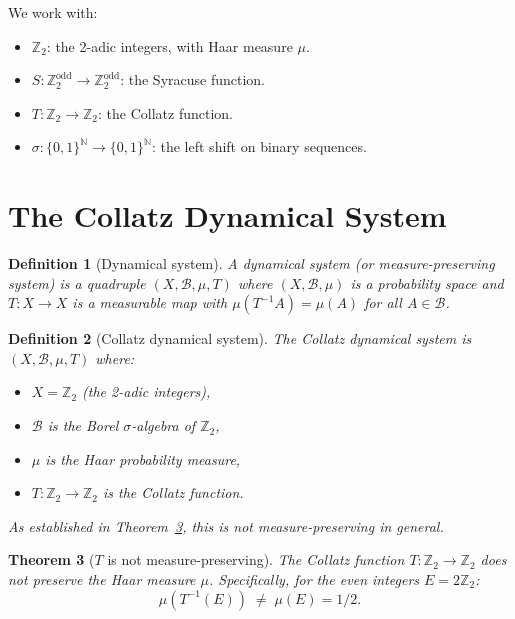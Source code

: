 \documentclass[12pt,a4paper]{article}
\newtheorem{theorem}{Theorem}[section]
\newtheorem{definition}[theorem]{Definition}
\begin{document}
We work with:
\begin{itemize}
  \item $\mathbb{Z}_2$: the 2-adic integers, with Haar measure $\mu$.
  \item $S\colon \mathbb{Z}_2^{\text{odd}} \to \mathbb{Z}_2^{\text{odd}}$: the Syracuse function.
  \item $T\colon \mathbb{Z}_2 \to \mathbb{Z}_2$: the Collatz function.
  \item $\sigma\colon \{0,1\}^\mathbb{N} \to \{0,1\}^\mathbb{N}$: the left shift on binary sequences.
\end{itemize}

\section{The Collatz Dynamical System}

\begin{definition}[Dynamical system]\label{def:dynsys}
A \emph{dynamical system} (or measure-preserving system) is a quadruple
$(X, \mathcal{B}, \mu, T)$ where $(X, \mathcal{B}, \mu)$ is a probability space and
$T\colon X \to X$ is a measurable map with $\mu(T^{-1}A) = \mu(A)$ for all $A \in \mathcal{B}$.
\end{definition}

\begin{definition}[Collatz dynamical system]\label{def:collatz_ds}
The \emph{Collatz dynamical system} is $(X, \mathcal{B}, \mu, T)$ where:
\begin{itemize}
  \item $X = \mathbb{Z}_2$ (the 2-adic integers),
  \item $\mathcal{B}$ is the Borel $\sigma$-algebra of $\mathbb{Z}_2$,
  \item $\mu$ is the Haar probability measure,
  \item $T\colon \mathbb{Z}_2 \to \mathbb{Z}_2$ is the Collatz function.
\end{itemize}
As established in Theorem~\ref{thm:not_measure_preserving}, this is \emph{not}
measure-preserving in general.
\end{definition}

\begin{theorem}[$T$ is not measure-preserving]\label{thm:not_measure_preserving}
The Collatz function $T\colon \mathbb{Z}_2 \to \mathbb{Z}_2$ does not preserve the
Haar measure $\mu$. Specifically, for the even integers $E = 2\mathbb{Z}_2$:
\[
  \mu(T^{-1}(E)) \;\neq\; \mu(E) = 1/2.
\]
\end{theorem}
\end{document}
